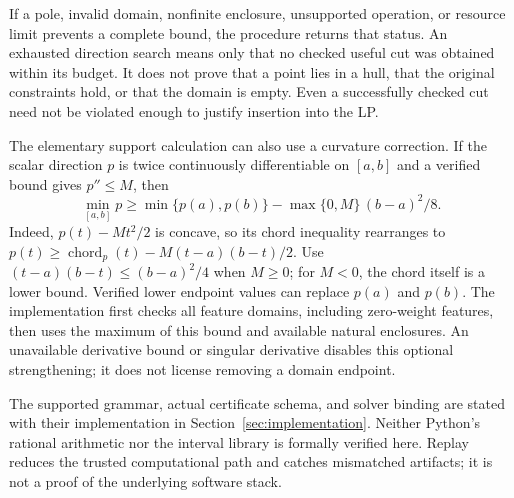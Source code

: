 If a pole, invalid domain, nonfinite enclosure, unsupported operation, or
resource limit prevents a complete bound, the procedure returns that
status. An exhausted direction search means only that no checked useful
cut was obtained within its budget. It does not prove that a point lies
in a hull, that the original constraints hold, or that the domain is
empty. Even a successfully checked cut need not be violated enough to
justify insertion into the LP.

The elementary support calculation can also use a curvature correction.
If the scalar direction $p$ is twice continuously differentiable on
$[a,b]$ and a verified bound gives $p''\le M$, then
\begin{equation}\label{eq:chord-correction}
\min_{[a,b]}p\ge
\min\{p(a),p(b)\}-\max\{0,M\}\,(b-a)^2/8.
\end{equation}
Indeed, $p(t)-Mt^2/2$ is concave, so its chord inequality rearranges to
$p(t)\ge\operatorname{chord}_p(t)-M(t-a)(b-t)/2$.
Use $(t-a)(b-t)\le(b-a)^2/4$ when $M\ge0$; for $M<0$, the
chord itself is a lower bound. Verified lower endpoint values can
replace $p(a)$ and $p(b)$. The implementation first checks all feature
domains, including zero-weight features, then uses the maximum of this
bound and available natural enclosures. An unavailable derivative bound
or singular derivative disables this optional strengthening; it does
not license removing a domain endpoint.

The supported grammar, actual certificate schema, and solver binding
are stated with their implementation in Section~\ref{sec:implementation}.
Neither Python's rational arithmetic nor the interval library is
formally verified here. Replay reduces the trusted computational path
and catches mismatched artifacts; it is not a proof of the underlying
software stack.

